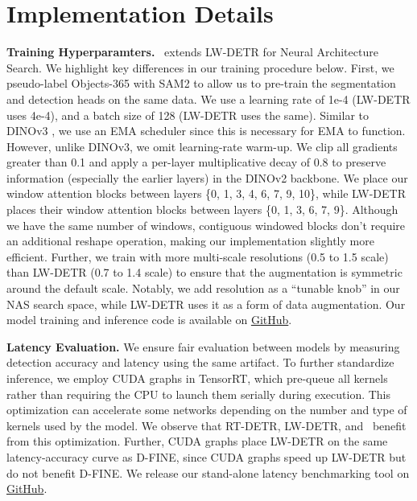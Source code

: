 \appendix

\section{Implementation Details}
\label{sec:implementation_details}
\textbf{Training Hyperparamters.} \method \ extends LW-DETR \citep{chen2024lw} for Neural Architecture Search. We highlight key differences in our training procedure below. First, we pseudo-label Objects-365 \citep{objects365} with SAM2 \citep{ravi2024sam2} to allow us to pre-train the segmentation and detection heads on the same data. We use a learning rate of 1e-4 (LW-DETR uses 4e-4), and a batch size of 128 (LW-DETR uses the same). Similar to DINOv3 \citep{simeoni2025dinov3}, we use an EMA scheduler since this is necessary for EMA to function. However, unlike DINOv3, we omit learning-rate warm-up. We clip all gradients greater than 0.1 and apply a per-layer multiplicative decay of 0.8 to preserve information (especially the earlier layers) in the DINOv2 backbone. We place our window attention blocks between layers \{0, 1, 3, 4, 6, 7, 9, 10\}, while LW-DETR places their window attention blocks between layers \{0, 1, 3, 6, 7, 9\}. Although we have the same number of windows, contiguous windowed blocks don't require an additional reshape operation, making our implementation slightly more efficient. Further, we train with more multi-scale resolutions (0.5 to 1.5 scale) than LW-DETR (0.7 to 1.4 scale) to ensure that the augmentation is symmetric around the default scale. Notably, we add resolution as a ``tunable knob'' in our NAS search space, while LW-DETR uses it as a form of data augmentation. Our model training and inference code is available on \href{https://github.com/roboflow/rf-detr}{GitHub}.

\textbf{Latency Evaluation.} We ensure fair evaluation between models by measuring detection accuracy and latency using the same artifact. To further standardize inference, we employ CUDA graphs in TensorRT, which pre-queue all kernels rather than requiring the CPU to launch them serially during execution. This optimization can accelerate some networks depending on the number and type of kernels used by the model. We observe that RT-DETR, LW-DETR, and \method \ benefit from this optimization. Further, CUDA graphs place LW-DETR on the same latency-accuracy curve as D-FINE, since CUDA graphs speed up LW-DETR but do not benefit D-FINE. We release our stand-alone latency benchmarking tool on \href{https://github.com/roboflow/single_artifact_benchmarking}{GitHub}.

